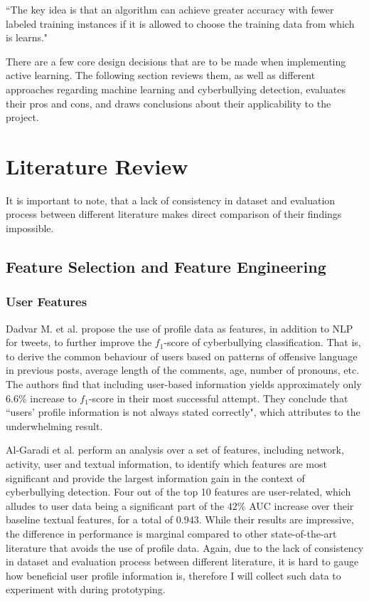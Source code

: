 \documentclass[a4paper,12pt]{article}
\begin{document}
``The key idea is that an algorithm can achieve greater accuracy with fewer labeled training instances if it is allowed to choose the training data from which is learns."\cite{Settles2009}

There are a few core design decisions that are to be made when implementing active learning. The following section reviews them, as well as different approaches regarding machine learning and cyberbullying detection, evaluates their pros and cons, and draws conclusions about their applicability to the project.
\section{Literature Review}
It is important to note, that a lack of consistency in dataset and evaluation process between different literature makes direct comparison of their findings impossible.
\subsection{Feature Selection and Feature Engineering}
\subsubsection{User Features}
Dadvar M. et al. \cite{Dadvar2013} propose the use of profile data as features, in addition to NLP for tweets, to further improve the $f_1$-score of cyberbullying classification. That is, to derive the common behaviour of users based on patterns of offensive language in previous posts, average length of the comments, age, number of pronouns, etc. The authors find that including user-based information yields approximately only $6.6\%$ increase to $f_1$-score in their most successful attempt. They conclude that ``users' profile information is not always stated correctly", which attributes to the underwhelming result.

Al-Garadi et al. \cite{garadi-highestf/top10features} perform an analysis over a set of features, including network, activity, user and textual information, to identify which features are most significant and provide the largest information gain in the context of cyberbullying detection. Four out of the top 10 features are user-related, which alludes to user data being a significant part of the $42\%$ AUC increase over their baseline textual features, for a total of $0.943$. While their results are impressive, the difference in performance is marginal compared to other state-of-the-art literature that avoids the use of profile data. Again, due to the lack of consistency in dataset and evaluation process between different literature, it is hard to gauge how beneficial user profile information is, therefore I will collect such data to experiment with during prototyping.
\end{document}
